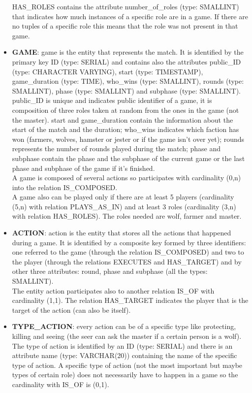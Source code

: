 \begin{itemize}
    HAS\_ROLES contains the attribute number\_of\_roles (type: SMALLINT) that indicates how much instances of a specific role are in a game. If there are no tuples of a specific role this means that the role was not present in that game.
    \item \textbf{GAME}: game is the entity that represents the match. It is identified by the primary key ID (type: SERIAL) and contains also the attributes public\_ID (type: CHARACTER VARYING), start (type: TIMESTAMP), game\_duration (type: TIME), who\_wins (type: SMALLINT), rounds (type: SMALLINT), phase (type: SMALLINT) and subphase (type: SMALLINT). public\_ID is unique and indicates public identifier of a game, it is composition of three roles taken at random from the ones in the game (not the master). start and game\_duration contain the information about the start of the match  and the duration; who\_wins indicates which faction has won (farmers, wolves, hamster or jester or if the game isn't over yet); rounds represents the number of rounds played during the match; phase and subphase contain the phase and the subphase of the current game or the last phase and subphase of the game if it's finished. \\
    A game is composed of several actions so participates with cardinality (0,n) into the relation IS\_COMPOSED. \\
    A game also can be played only if there are at least 5 players (cardinality (5,n) with relation PLAYS\_AS\_IN) and at least 3 roles (cardinality (3,n) with relation HAS\_ROLES). The roles needed are wolf, farmer and master.
    \item \textbf{ACTION}: action is the entity that stores all the actions that happened during a game. It is identified by a composite key formed by three identifiers: one referred to the game (through the relation IS\_COMPOSED) and two to the player (through the relations EXECUTES and HAS\_TARGET) and by other three attributes: round, phase and subphase (all the types: SMALLINT).\\
    The entity action participates also to another relation IS\_OF with cardinality (1,1). The relation HAS\_TARGET indicates the player that is the target of the action (can also be itself).
    \item \textbf{TYPE\_ACTION}: every action can be of a specific type like protecting, killing and seeing (the seer can ask the master if a certain person is a wolf). The type of action is identified by an ID (type: SERIAL) and there is an attribute name (type: VARCHAR(20)) containing the name of the specific type of action. A specific type of action (not the most important but maybe types of certain role) does not necessarily have to happen in a game so the cardinality with IS\_OF is (0,1). 
\end{itemize}